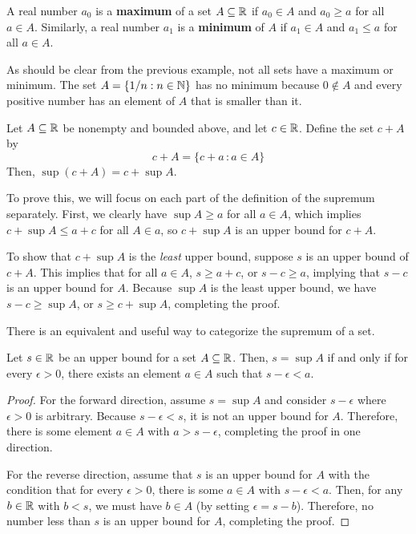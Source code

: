 \begin{definition}
    A real number $a_0$ is a \textbf{maximum} of a set $A\subseteq \mathbb{R}$ if $a_0\in A$ and $a_0 \geq a$ for all $a\in A$. Similarly, a real number $a_1$ is a \textbf{minimum} of $A$ if $a_1\in A$ and $a_1 \leq a$ for all $a\in A$. 
\end{definition}
As should be clear from the previous example, not all sets have a maximum or minimum. The set $A = \{1/n: n\in \mathbb{N}\}$ has no minimum because $0\not\in A$ and every positive number has an element of $A$ that is smaller than it. 

\begin{example}
    Let $A\subseteq \mathbb{R}$ be nonempty and bounded above, and let $c\in \mathbb{R}$. Define the set $c + A$ by
    \[ c+ A = \{ c + a \, : a\in A \} \]
    Then, $\sup(c+A) = c +\sup A$. 

    To prove this, we will focus on each part of the definition of the supremum separately. First, we clearly have $\sup A \geq a$ for all $a\in A$, which implies $c + \sup A \leq a + c$ for all $A \in a$, so $c + \sup A$ is an upper bound for $c + A$. 

    To show that $c + \sup A$ is the \textit{least} upper bound, suppose $s$ is an upper bound of $c+ A$. This implies that for all $a\in A$, $s \geq a + c$, or $s - c \geq a$, implying that $s-c$ is an upper bound for $A$. Because $\sup A$ is the least upper bound, we have $s-c \geq \sup A$, or $s \geq c + \sup A$, completing the proof.
\end{example}
There is an equivalent and useful way to categorize the supremum of a set.
\begin{lemma}
    Let $s\in\mathbb{R}$ be an upper bound for a set $A\subseteq \mathbb{R}$. Then, $s=\sup A$ if and only if for every $\epsilon > 0$, there exists an element $a\in A$ such that $s-\epsilon < a$. 
\end{lemma}
\begin{proof}
    For the forward direction, assume $s=\sup A$ and consider $s-\epsilon$ where $\epsilon > 0$ is arbitrary. Because $s-\epsilon < s$, it is not an upper bound for $A$. Therefore, there is some element $a\in A$ with $a > s-\epsilon$, completing the proof in one direction.
    
    For the reverse direction, assume that $s$ is an upper bound for $A$ with the condition that for every $\epsilon > 0$, there is some $a\in A$ with $s-\epsilon < a$. Then, for any $b\in \mathbb{R}$ with $b < s$, we must have $b\in A$ (by setting $\epsilon = s - b$). Therefore, no number less than $s$ is an upper bound for $A$, completing the proof.   
\end{proof}
